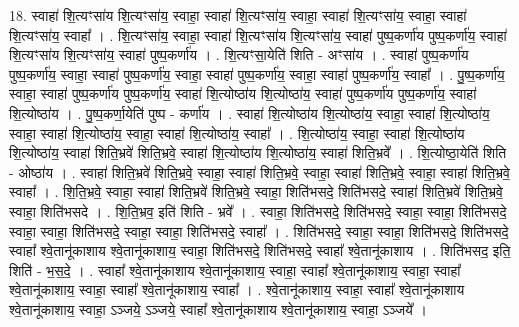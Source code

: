 \documentclass[17pt]{extarticle}
\begin{document}
18. स्वाहा॑ शि॒त्यꣳसा॑य शि॒त्यꣳसा॑य॒ स्वाहा॒ स्वाहा॑ शि॒त्यꣳसा॑य॒ स्वाहा॒ स्वाहा॑ शि॒त्यꣳसा॑य॒ स्वाहा॒ स्वाहा॑ शि॒त्यꣳसा॑य॒ स्वाहा᳚ । . शि॒त्यꣳसा॑य॒ स्वाहा॒ स्वाहा॑ शि॒त्यꣳसा॑य शि॒त्यꣳसा॑य॒ स्वाहा॑ पुष्प॒कर्णा॑य पुष्प॒कर्णा॑य॒ स्वाहा॑ शि॒त्यꣳसा॑य शि॒त्यꣳसा॑य॒ स्वाहा॑ पुष्प॒कर्णा॑य । . शि॒त्यꣳसा॒येति॑ शिति - अꣳसा॑य । . स्वाहा॑ पुष्प॒कर्णा॑य पुष्प॒कर्णा॑य॒ स्वाहा॒ स्वाहा॑ पुष्प॒कर्णा॑य॒ स्वाहा॒ स्वाहा॑ पुष्प॒कर्णा॑य॒ स्वाहा॒ स्वाहा॑ पुष्प॒कर्णा॑य॒ स्वाहा᳚ । . पु॒ष्प॒कर्णा॑य॒ स्वाहा॒ स्वाहा॑ पुष्प॒कर्णा॑य पुष्प॒कर्णा॑य॒ स्वाहा॑ शि॒त्योष्ठा॑य शि॒त्योष्ठा॑य॒ स्वाहा॑ पुष्प॒कर्णा॑य पुष्प॒कर्णा॑य॒ स्वाहा॑ शि॒त्योष्ठा॑य । . पु॒ष्प॒कर्णा॒येति॑ पुष्प - कर्णा॑य । . स्वाहा॑ शि॒त्योष्ठा॑य शि॒त्योष्ठा॑य॒ स्वाहा॒ स्वाहा॑ शि॒त्योष्ठा॑य॒ स्वाहा॒ स्वाहा॑ शि॒त्योष्ठा॑य॒ स्वाहा॒ स्वाहा॑ शि॒त्योष्ठा॑य॒ स्वाहा᳚ । . शि॒त्योष्ठा॑य॒ स्वाहा॒ स्वाहा॑ शि॒त्योष्ठा॑य शि॒त्योष्ठा॑य॒ स्वाहा॑ शिति॒भ्रवे॑ शिति॒भ्रवे॒ स्वाहा॑ शि॒त्योष्ठा॑य शि॒त्योष्ठा॑य॒ स्वाहा॑ शिति॒भ्रवे᳚ । . शि॒त्योष्ठा॒येति॑ शिति - ओष्ठा॑य । . स्वाहा॑ शिति॒भ्रवे॑ शिति॒भ्रवे॒ स्वाहा॒ स्वाहा॑ शिति॒भ्रवे॒ स्वाहा॒ स्वाहा॑ शिति॒भ्रवे॒ स्वाहा॒ स्वाहा॑ शिति॒भ्रवे॒ स्वाहा᳚ । . शि॒ति॒भ्रवे॒ स्वाहा॒ स्वाहा॑ शिति॒भ्रवे॑ शिति॒भ्रवे॒ स्वाहा॒ शिति॑भसदे॒ शिति॑भसदे॒ स्वाहा॑ शिति॒भ्रवे॑ शिति॒भ्रवे॒ स्वाहा॒ शिति॑भसदे । . शि॒ति॒भ्रव॒ इति॑ शिति - भ्रवे᳚ । . स्वाहा॒ शिति॑भसदे॒ शिति॑भसदे॒ स्वाहा॒ स्वाहा॒ शिति॑भसदे॒ स्वाहा॒ स्वाहा॒ शिति॑भसदे॒ स्वाहा॒ स्वाहा॒ शिति॑भसदे॒ स्वाहा᳚ । . शिति॑भसदे॒ स्वाहा॒ स्वाहा॒ शिति॑भसदे॒ शिति॑भसदे॒ स्वाहा᳚ श्वे॒तानू॑काशाय श्वे॒तानू॑काशाय॒ स्वाहा॒ शिति॑भसदे॒ शिति॑भसदे॒ स्वाहा᳚ श्वे॒तानू॑काशाय । . शिति॑भसद॒ इति॒ शिति॑ - भ॒स॒दे॒ । . स्वाहा᳚ श्वे॒तानू॑काशाय श्वे॒तानू॑काशाय॒ स्वाहा॒ स्वाहा᳚ श्वे॒तानू॑काशाय॒ स्वाहा॒ स्वाहा᳚ श्वे॒तानू॑काशाय॒ स्वाहा॒ स्वाहा᳚ श्वे॒तानू॑काशाय॒ स्वाहा᳚ । . श्वे॒तानू॑काशाय॒ स्वाहा॒ स्वाहा᳚ श्वे॒तानू॑काशाय श्वे॒तानू॑काशाय॒ स्वाहा॒ ऽञ्जये॒ ऽञ्जये॒ स्वाहा᳚ श्वे॒तानू॑काशाय श्वे॒तानू॑काशाय॒ स्वाहा॒ ऽञ्जये᳚ । \newline
\end{document}
